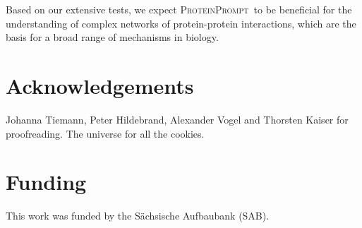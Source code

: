 \documentclass{bioinfo}
\newcommand{\tool}{\textsc{ProteinPrompt}}
\begin{document}
Based on our extensive tests, we expect \tool\
to be beneficial for the understanding of complex networks of protein-protein interactions,
which are the basis for a broad range of mechanisms in biology.


\section*{Acknowledgements} 
Johanna Tiemann, Peter Hildebrand, Alexander Vogel and Thorsten Kaiser for proofreading.
The universe for all the cookies.

\section*{Funding}

This work was funded by the S\"achsische Aufbaubank (SAB).



\end{document}
